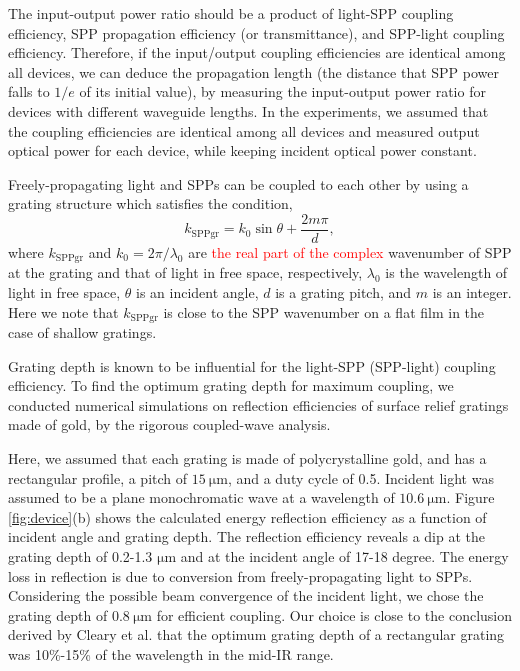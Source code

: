 \documentclass[aip,apl,reprint]{revtex4-1}
\begin{document}
The input-output power ratio should be a product of light-SPP coupling efficiency, SPP propagation efficiency (or transmittance), and SPP-light coupling efficiency. Therefore, if the input/output coupling efficiencies are identical among all devices, we can deduce the propagation length (the distance that SPP power falls to $1/e$ of its initial value), by measuring the input-output power ratio for devices with different waveguide lengths.  In the experiments, we assumed that the coupling efficiencies are identical among all devices and measured output optical power for each device, while keeping incident optical power constant. 

Freely-propagating light and SPPs can be coupled to each other by using a grating structure which satisfies the condition\cite{Koev},
\begin{equation}
k_{\mathrm{SPPgr}}=k_0 \sin \theta + \frac{2m\pi}{d},
\label{eq:phase-match}
\end{equation}
where $k_{\mathrm{SPPgr}}$ and $k_0=2\pi/\lambda_0$ are \textcolor{red}{the real part of the complex} wavenumber of SPP at the grating and that of light in free space, respectively, $\lambda_0$ is the wavelength of light in free space, $\theta$ is an incident angle, $d$ is a grating pitch, and $m$ is an integer. Here we note that $k_{\mathrm{SPPgr}}$ is close to the SPP wavenumber on a flat film in the case of shallow gratings.

Grating depth is known to be influential for the light-SPP (SPP-light) coupling efficiency\cite{Koev, Cleary2010}. To find the optimum grating depth for maximum coupling, we conducted numerical simulations on reflection efficiencies of surface relief gratings made of gold, by the rigorous coupled-wave analysis\cite{Moharam}. 

Here, we assumed that each grating is made of polycrystalline gold, and has a rectangular profile, a pitch of $15\:\mathrm{\mu m}$, and a duty cycle of 0.5. Incident light was assumed to be a plane monochromatic wave at a wavelength of $10.6\:\mathrm{\mu m}$. 
Figure \ref{fig:device}(b) shows the calculated energy reflection efficiency as a function of incident angle and grating depth. The reflection efficiency reveals a dip at the grating depth of 0.2-1.3 $\mathrm{\mu m}$ and at the incident angle of 17-18 degree. The energy loss in reflection is due to conversion from freely-propagating light to SPPs.
Considering the possible beam convergence of the incident light, we chose the grating depth of $0.8\:\mathrm{\mu m}$ for efficient coupling. Our choice is close to the conclusion derived by Cleary et al.\cite{Cleary2010} that the optimum grating depth of a rectangular grating was 10\%-15\% of the wavelength in the mid-IR range.
\end{document}
